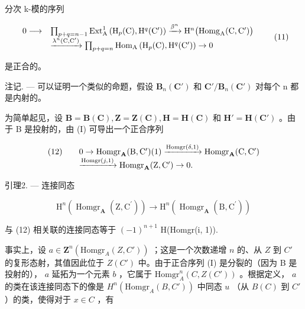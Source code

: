 分次 k-模的序列

\[
\begin{array}{r l} 0 \longrightarrow & \prod_ {p + q = n - 1} \operatorname{Ext} _ {\mathrm{A}} ^ {1} \left(\mathrm{H} _ {p} (\mathrm{C}), \mathrm{H} ^ {q} (\mathrm{C} ^ {\prime})\right) \xrightarrow {\beta^ {n}} \mathrm{H} ^ {n} \big (\mathrm{Homg} _ {\mathrm{A}} (\mathrm{C}, \mathrm{C} ^ {\prime}) \big) \\ & \xrightarrow {\lambda^ {n} (\mathrm{C} , \mathrm{C} ^ {\prime})} \prod_ {p + q = n} \mathrm{Hom} _ {\mathrm{A}} \left(\mathrm{H} _ {p} (\mathrm{C}), \mathrm{H} ^ {q} (\mathrm{C} ^ {\prime})\right) \to 0 \end{array}\tag{11}
\]

是正合的。

注记. --- 可以证明一个类似的命题，假设 \(\mathbf{B}_{n}(\mathbf{C}')\) 和 \(\mathbf{C}'/\mathbf{B}_{n}(\mathbf{C}')\) 对每个 n 都是内射的。

为简单起见，设 \(\mathbf{B} = \mathbf{B}(\mathbf{C}), \mathbf{Z} = \mathbf{Z}(\mathbf{C}), \mathbf{H} = \mathbf{H}(\mathbf{C})\) 和 \(\mathbf{H}' = \mathbf{H}(\mathbf{C}')\) 。由于 B 是投射的，由 (I) 可导出一个正合序列

\[
\begin{array}{r l}(1 2) \quad&0 \rightarrow \operatorname{Homgr} _ {\mathbf {A}} (\mathrm{B}, \mathrm{C} ^ {\prime}) (1) \xrightarrow {\operatorname{Homgr} (\delta , 1)} \operatorname{Homgr} _ {\mathbf {A}} (\mathrm{C}, \mathrm{C} ^ {\prime})\\&\xrightarrow {\operatorname{Homgr} (j , 1)} \operatorname{Homgr} _ {\mathbf {A}} (\mathrm{Z}, \mathrm{C} ^ {\prime}) \rightarrow 0.\end{array}
\]

引理2. --- 连接同态

\[
\mathrm{H} ^ {n} \left(\operatorname{Homgr} _ {\mathbf {A}} \left(\mathrm{Z}, \mathrm{C} ^ {\prime}\right)\right)\rightarrow \mathrm{H} ^ {n} \left(\operatorname{Homgr} _ {\mathbf {A}} \left(\mathrm{B}, \mathrm{C} ^ {\prime}\right)\right)
\]

与 (12) 相关联的连接同态等于 \((-1)^{n+1}\) H(Homgr(i, 1)).

事实上，设 \(a \in \mathbf{Z}^n(\text{Homgr}_A(Z, C'))\) ；这是一个次数递增 \(n\) 的、从 \(Z\) 到 \(C'\) 的复形态射，其值因此位于 \(Z(C')\) 中。由于正合序列 (I) 是分裂的（因为 B 是投射的）， \(a\) 延拓为一个元素 \(b\) ，它属于 \(\text{Homgr}_A^n(C, Z(C'))\) 。根据定义， \(a\) 的类在该连接同态下的像是 \(H^n(\text{Homgr}_A(B, C'))\) 中同态 \(u\) （从 \(B(C)\) 到 \(C'\) ）的类，使得对于 \(x \in C\) ，有

